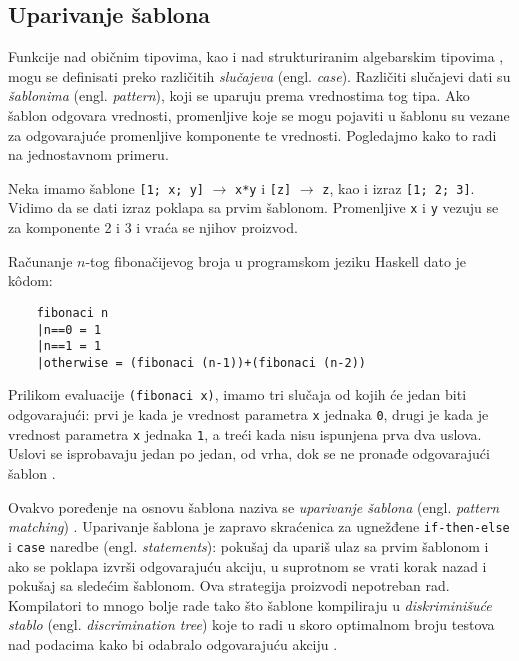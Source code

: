\subsection{Uparivanje šablona}

Funkcije nad običnim tipovima, kao i nad strukturiranim algebarskim tipovima \cite{algebraic-types}, mogu se definisati preko različitih \textit{slučajeva} (engl. \textit{case}). Različiti slučajevi dati su \textit{šablonima} (engl. \textit{pattern}), koji se uparuju prema vrednostima tog tipa. Ako šablon odgovara vrednosti, promenljive koje se mogu pojaviti u šablonu su vezane za odgovarajuće promenljive komponente te vrednosti. Pogledajmo kako to radi na jednostavnom primeru. 


\begin{primer}
	Neka imamo šablone \verb|[1; x; y]| $\longrightarrow$ \verb|x*y| i \verb|[z]| $\longrightarrow$ \verb|z|, kao i izraz \verb|[1; 2; 3]|. Vidimo da se dati izraz poklapa sa prvim šablonom. Promenljive \verb|x| i \verb|y| vezuju se za komponente 2 i 3 i vraća se njihov proizvod.
\end{primer}


\begin{primer}
	Računanje $n$-tog fibonačijevog broja u programskom jeziku Haskell dato je k\^odom:
	\begin{verbatim}
	fibonaci n
	|n==0 = 1
	|n==1 = 1
	|otherwise = (fibonaci (n-1))+(fibonaci (n-2))
	\end{verbatim}
	Prilikom evaluacije \verb|(fibonaci x)|, imamo tri slučaja od kojih će jedan biti odgovarajući: prvi je kada je vrednost parametra \verb|x| jednaka \verb|0|, drugi je kada je vrednost parametra \verb|x| jednaka \verb|1|, a treći kada nisu ispunjena prva dva uslova. Uslovi se isprobavaju jedan po jedan, od vrha, dok se ne pronađe odgovarajući šablon \cite{the-implementation-of-functional-programming-languages}.
\end{primer}

Ovakvo poređenje na osnovu šablona naziva se \textit{uparivanje šablona} (engl. \textit{pattern matching}) \cite{compiler-design}. Uparivanje šablona je zapravo skraćenica za ugnežđene \verb|if-then-else| i \verb|case| naredbe (engl. \textit{statements}): pokušaj da upariš ulaz sa prvim šablonom i ako se poklapa izvrši odgovarajuću akciju, u suprotnom se vrati korak nazad i pokušaj sa sledećim šablonom. Ova strategija proizvodi nepotreban rad. Kompilatori to mnogo bolje rade tako što šablone kompiliraju u \textit{diskriminišuće stablo} (engl. \textit{discrimination tree}) koje to radi u skoro optimalnom broju testova nad podacima kako bi odabralo odgovarajuću akciju \cite{compiling-fl}.

